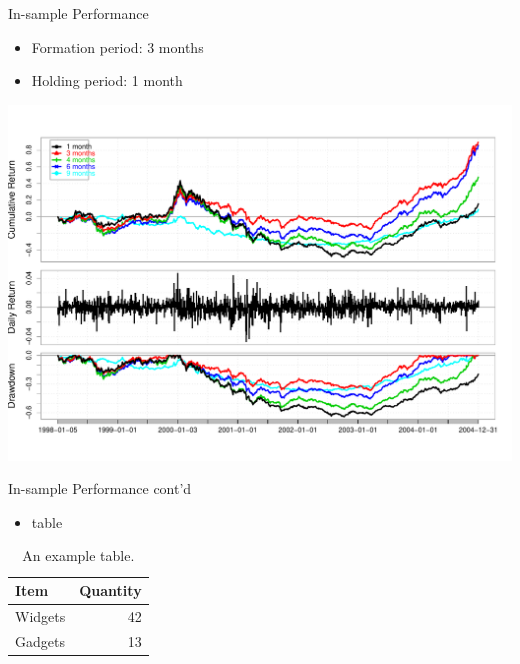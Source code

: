\documentclass{beamer}
\makeatletter
\def\maxwidth{ %
	\ifdim\Gin@nat@width>\linewidth
	\linewidth
	\else
	\Gin@nat@width
	\fi
}
\makeatother
\begin{document}
\begin{frame}{In-sample Performance}
	\begin{itemize}
		\item Formation period: 3 months
		\item Holding period: 1 month
	\end{itemize}
	\includegraphics[width=\maxwidth]{figures/FinalIn}
\end{frame}

\begin{frame}{In-sample Performance cont'd}
	\begin{itemize}
		\item table
	\end{itemize}
	
	\begin{table}
		\centering
		\begin{tabular}{l|r}
			Item & Quantity \\\hline
			Widgets & 42 \\
			Gadgets & 13
		\end{tabular}
		\caption{\label{tab:widgets}An example table.}
	\end{table}
\end{frame}
\end{document}
